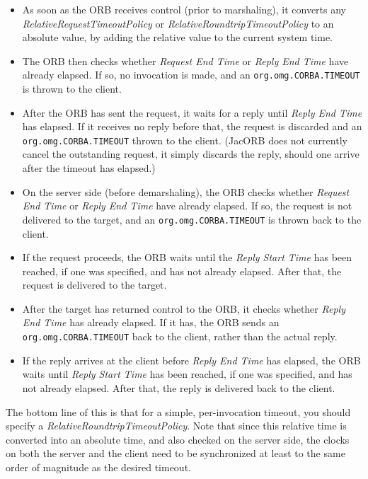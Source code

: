 \begin{itemize}
\item As soon as the ORB receives control (prior to marshaling), it
converts any \emph{RelativeRequestTimeoutPolicy} or
\emph{RelativeRoundtripTimeoutPolicy} to an absolute value, by adding
the relative value to the current system time.

\item The ORB then checks whether \emph{Request End Time} or
\emph{Reply End Time} have already elapsed.  If so, no invocation is
made, and an {\tt org.omg.CORBA.TIMEOUT} is thrown to the client.

\item After the ORB has sent the request, it waits for a reply until
\emph{Reply End Time} has elapsed.  If it receives no reply before
that, the request is discarded and an {\tt org.omg.CORBA.TIMEOUT}
thrown to the client.  (JacORB does not currently cancel the
outstanding request, it simply discards the reply, should one arrive
after the timeout has elapsed.)

\item On the server side (before demarshaling), the ORB checks
whether \emph{Request End Time} or \emph{Reply End Time} have already
elapsed.  If so, the request is not delivered to the target, and an
{\tt org.omg.CORBA.TIMEOUT} is thrown back to the client.

\item If the request proceeds, the ORB waits until the \emph{Reply
Start Time} has been reached, if one was specified, and has not
already elapsed.  After that, the request is delivered to the target.

\item After the target has returned control to the ORB, it checks
whether \emph{Reply End Time} has already elapsed.  If it has, the ORB
sends an {\tt org.omg.CORBA.TIMEOUT} back to the client, rather than
the actual reply.

\item If the reply arrives at the client before \emph{Reply End Time}
has elapsed, the ORB waits until \emph{Reply Start Time} has been
reached, if one was specified, and has not already elapsed.  After
that, the reply is delivered back to the client.

\end{itemize}

The bottom line of this is that for a simple, per-invocation timeout,
you should specify a \mbox{\emph{RelativeRoundtripTimeoutPolicy}}.  Note
that since this relative time is converted into an absolute time, and
also checked on the server side, the clocks on both the server and
the client need to be synchronized at least to the same order of
magnitude as the desired timeout.

